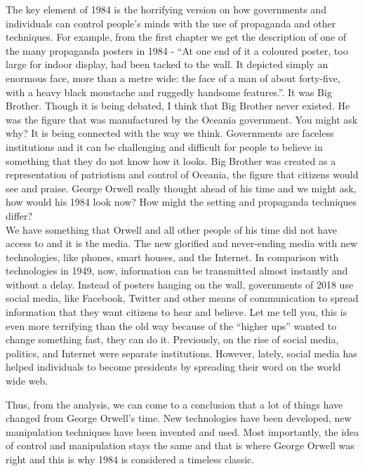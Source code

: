 \documentclass[a4paper,12pt]{article}
\begin{document}
The key element of 1984 is the horrifying version on how governments and individuals can control people's minds with the use of propaganda and other techniques. For example, from the first chapter we get the description of one of the many propaganda posters in 1984 - ``At one end of it a coloured poster, too large for indoor display, had been tacked to the wall. It depicted simply an enormous face, more than a metre wide: the face of a man of about forty-five, with a heavy black moustache and ruggedly handsome features.''. It was Big Brother. Though it is being debated, I think that Big Brother never existed. He was the figure that was manufactured by the Oceania government. You might ask why? It is being connected with the way we think. Governments are faceless institutions and it can be challenging and difficult for people to believe in something that they do not know how it looks. Big Brother was created as a representation of patriotism and control of Oceania, the figure that citizens would see and praise. George Orwell really thought ahead of his time and we might ask, how would his 1984 look now? How might the setting and propaganda techniques differ?\\

We have something that Orwell and all other people of his time did not have access to and it is the media. The new glorified and never-ending media with new technologies, like phones, smart houses, and the Internet. In comparison with technologies in 1949, now, information can be transmitted almost instantly and without a delay. Instead of posters hanging on the wall, governments of 2018 use social media, like Facebook, Twitter and other means of communication to spread information that they want citizens to hear and believe. Let me tell you, this is even more terrifying than the old way because of the ``higher ups'' wanted to change something fast, they can do it. Previously, on the rise of social media, politics, and Internet were separate institutions. However, lately, social media has helped individuals to become presidents by spreading their word on the world wide web.

Thus, from the analysis, we can come to a conclusion that a lot of things have changed from George Orwell's time. New technologies have been developed, new manipulation techniques have been invented and used. Most importantly, the idea of control and manipulation stays the same and that is where George Orwell was right and this is why 1984 is considered a timeless classic.

%
%
\end{document}
